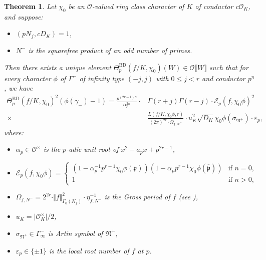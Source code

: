 \documentclass[10pt,letterpaper]{amsart}
\theoremstyle{plain}
\newtheorem{thm}{Theorem}[subsection] %
\theoremstyle{definition}
\theoremstyle{definition}
\theoremstyle{plain}
\theoremstyle{plain}
\theoremstyle{plain}
\theoremstyle{remark}
\numberwithin{equation}{section}
\newcommand{\eps}{\varepsilon}
\newcommand{\pp}{\mathfrak{p}}
\DeclareMathOperator{\BD}{BD} %
\def\cO{\mathcal O}
\newcommand{\dBr}[1]{\llbracket{#1}\rrbracket}
\newcommand{\pwseries}[1]{[\![#1]\!]}
\begin{document}

\begin{thm}\label{thm:BD-theta}
Let $\chi_0$ be an $\cO$-valued ring class character of $K$ of conductor $c\cO_K$, and suppose: %
\begin{itemize}
	\item[(i)] {} $(pN_f,cD_K)=1$,
    \item[(ii)] {} $N^-$ is the squarefree product of an odd number of primes.
\end{itemize}
Then there exists a unique element $\Theta_p^{\BD}(f/K,\chi_0)(W)\in\cO\dBr{W}$ such that for every character $\phi$ of $\Gamma^-$ of infinity type $(-j,j)$ with $0\leq j<r$ and conductor $p^n$, we have
\begin{align*}
    \Theta_p^{\BD}(f/K,\chi_0)^2(\phi(\gamma_-)-1)=\frac{p^{(2r-1)n}}{\alpha_p^{2n}}\cdot&\Gamma(r+j)\Gamma(r-j)\cdot\mathcal{E}_p(f,\chi_0\phi)^{2}\\ \times &\frac{L(f/K,\chi_0\phi,r)}{(2\pi)^{2r}\cdot \Omega_{f,N^-}}\cdot u_K^2\sqrt{D_K}\chi_0\phi(\sigma_{\mathfrak{N}^+})\cdot\eps_p,
\end{align*}
where:
\begin{itemize}
\item $\alpha_p\in\cO^\times$ is the $p$-adic unit root of $x^2-a_px+p^{2r-1}$,
\item 
$\mathcal{E}_p(f,\chi_0\phi)=
\begin{cases}
(1-\alpha_p^{-1}p^{r-1}\chi_0\phi(\pp))(1-\alpha_p p^{r-1}\chi_0\phi(\overline{\pp}))&
\textrm{if $n=0$,}\\[0.2em] 
1&\textrm{if $n>0$},
\end{cases}$

\item $\Omega_{f,N^-}=2^{2r}\cdot\Vert f\Vert_{\Gamma_0(N_f)}^2\cdot\eta_{f,N^-}^{-1}$ is the \emph{Gross period} of $f$ (see \cite[p.\,524]{hsieh-triple}),
\item $u_K=\vert\cO_K^\times\vert/2$, 
\item $\sigma_{\mathfrak{N}^+}\in\Gamma_\infty^-$ is Artin symbol of $\mathfrak{N}^+$, 
\item $\eps_p\in\{\pm 1\}$ is the local root number of $f$ at $p$. 
\end{itemize}
\end{thm}
\end{document}
